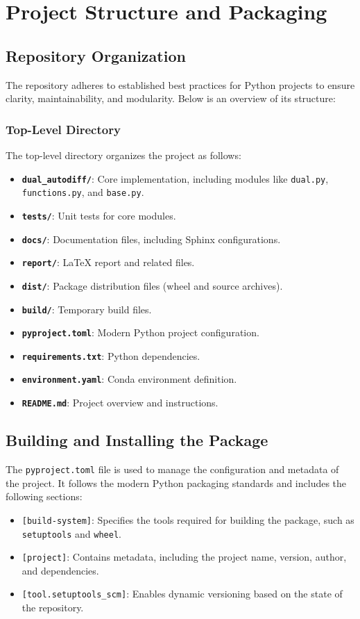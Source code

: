 \documentclass[a4paper,12pt]{article}
\begin{document}
\section{Project Structure and Packaging}

\subsection{Repository Organization}
The repository adheres to established best practices for Python projects to ensure clarity, maintainability, and modularity. Below is an overview of its structure:

\subsubsection{Top-Level Directory}
The top-level directory organizes the project as follows:
\begin{itemize}
    \item \textbf{\texttt{dual\_autodiff/}}: Core implementation, including modules like \texttt{dual.py}, \texttt{functions.py}, and \texttt{base.py}.
    \item \textbf{\texttt{tests/}}: Unit tests for core modules.
    \item \textbf{\texttt{docs/}}: Documentation files, including Sphinx configurations.
    \item \textbf{\texttt{report/}}: LaTeX report and related files.
    \item \textbf{\texttt{dist/}}: Package distribution files (wheel and source archives).
    \item \textbf{\texttt{build/}}: Temporary build files.
    \item \textbf{\texttt{pyproject.toml}}: Modern Python project configuration.
    \item \textbf{\texttt{requirements.txt}}: Python dependencies.
    \item \textbf{\texttt{environment.yaml}}: Conda environment definition.
    \item \textbf{\texttt{README.md}}: Project overview and instructions.
\end{itemize}


\subsection{Building and Installing the Package}
The \texttt{pyproject.toml} file is used to manage the configuration and metadata of the project. It follows the modern Python packaging standards and includes the following sections:
\begin{itemize}
    \item \texttt{[build-system]}: Specifies the tools required for building the package, such as \texttt{setuptools} and \texttt{wheel}.
    \item \texttt{[project]}: Contains metadata, including the project name, version, author, and dependencies.
    \item \texttt{[tool.setuptools\_scm]}: Enables dynamic versioning based on the state of the repository.
\end{itemize}
\end{document}
